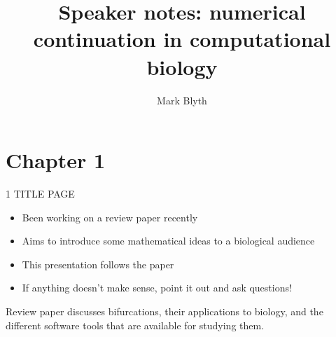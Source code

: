 \documentclass[presentation]{beamer}
\author{Mark Blyth}
\date{}
\title{Speaker notes: numerical continuation in computational biology}
\begin{document}
\maketitle

\section{Chapter 1}
\label{sec:org28ebb48}

\begin{frame}[label={sec:org7985250}]{1 TITLE PAGE}
\begin{itemize}
\item Been working on a review paper recently
\item Aims to introduce some mathematical ideas to a biological audience
\item This presentation follows the paper
\item If anything doesn't make sense, point it out and ask questions!
\end{itemize}

Review paper discusses bifurcations, their applications to biology, and the different software tools that are available for studying them.
\end{frame}
\end{document}
